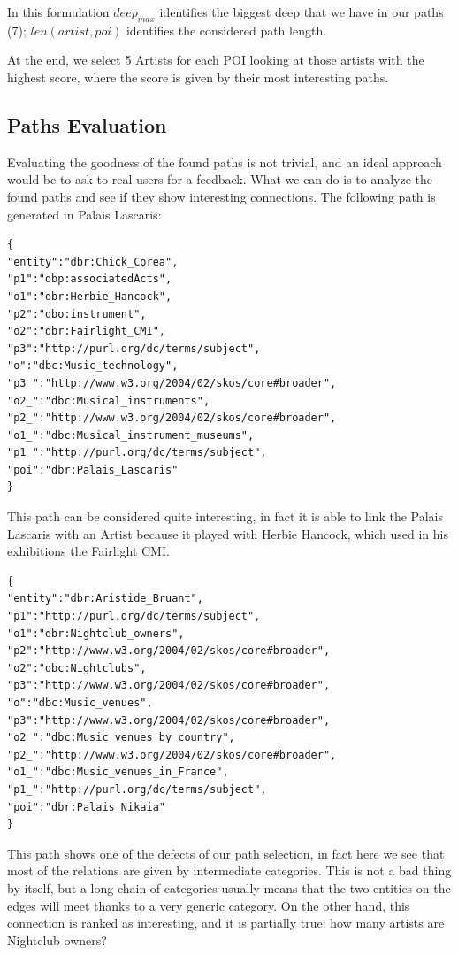 \documentclass[paper=a4, fontsize=11pt]{scrartcl}
\begin{document}
In this formulation $deep_{max}$ identifies the biggest deep that we have in our paths (7); $len(artist,poi)$ identifies the considered path length.

At the end, we select 5 Artists for each POI looking at those artists with the highest score, where the score is given by their most interesting paths.

\subsection{Paths Evaluation}
Evaluating the goodness of the found paths is not trivial, and an ideal approach would be to ask to real users for a feedback.
What we can do is to analyze the found paths and see if they show interesting connections.
The following path is generated in Palais Lascaris:
\begin{lstlisting}
{
"entity":"dbr:Chick_Corea",
"p1":"dbp:associatedActs",
"o1":"dbr:Herbie_Hancock",
"p2":"dbo:instrument",
"o2":"dbr:Fairlight_CMI",
"p3":"http://purl.org/dc/terms/subject",
"o":"dbc:Music_technology",
"p3_":"http://www.w3.org/2004/02/skos/core#broader",
"o2_":"dbc:Musical_instruments",
"p2_":"http://www.w3.org/2004/02/skos/core#broader",
"o1_":"dbc:Musical_instrument_museums",
"p1_":"http://purl.org/dc/terms/subject",
"poi":"dbr:Palais_Lascaris"
}
\end{lstlisting}
This path can be considered quite interesting, in fact it is able to link the Palais Lascaris with an Artist because it played with Herbie Hancock, which used in his exhibitions the Fairlight CMI.
\begin{lstlisting}
{
"entity":"dbr:Aristide_Bruant",
"p1":"http://purl.org/dc/terms/subject",
"o1":"dbr:Nightclub_owners",
"p2":"http://www.w3.org/2004/02/skos/core#broader",
"o2":"dbc:Nightclubs",
"p3":"http://www.w3.org/2004/02/skos/core#broader",
"o":"dbc:Music_venues",
"p3":"http://www.w3.org/2004/02/skos/core#broader",
"o2_":"dbc:Music_venues_by_country",
"p2_":"http://www.w3.org/2004/02/skos/core#broader",
"o1_":"dbc:Music_venues_in_France",
"p1_":"http://purl.org/dc/terms/subject",
"poi":"dbr:Palais_Nikaia"
}
\end{lstlisting}
This path shows one of the defects of our path selection, in fact here we see that most of the relations are given by intermediate categories. This is not a bad thing by itself, but a long chain of categories usually means that the two entities on the edges will meet thanks to a very generic category. On the other hand, this connection is ranked as interesting, and it is partially true: how many artists are Nightclub owners?
\end{document}
